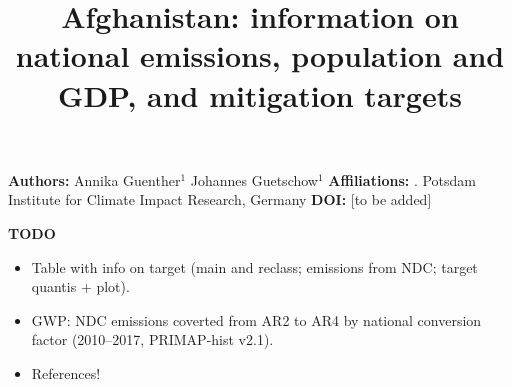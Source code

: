 \documentclass[12pt]{article}
\title{ \bfseries \color{PIKorange} Afghanistan: information on national emissions, population and GDP, and mitigation targets}
\begin{document}
 \maketitle

 \noindent \textbf{Authors:} \newline
 \indent Annika Guenther$^{1}$ \newline
 \indent Johannes Guetschow$^{1}$ \newline
 \noindent \textbf{Affiliations:} \newline
 . Potsdam Institute for Climate Impact Research, Germany \newline
 \noindent \textbf{DOI:} [to be added] \newline

 \textbf{TODO}
 \begin{itemize}
 \item Table with info on target (main and reclass; emissions from NDC; target quantis + plot).
 \item GWP: NDC emissions coverted from AR2 to AR4 by national conversion factor (2010--2017, PRIMAP-hist v2.1).
 \item References!
 \end{itemize}

\end{document}
